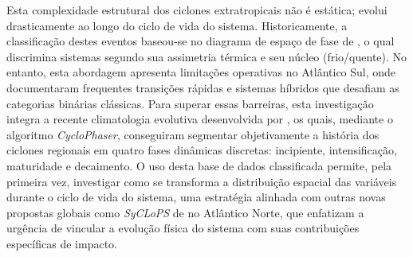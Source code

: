 Esta complexidade estrutural dos ciclones extratropicais não é estática; evolui drasticamente ao longo do ciclo de vida do sistema. Historicamente, a classificação destes eventos baseou-se no diagrama de espaço de fase de \citet{hart2003cyclone}, o qual discrimina sistemas segundo sua assimetria térmica e seu núcleo (frio/quente).
No entanto, esta abordagem apresenta limitações operativas no Atlântico Sul, onde \citet{reboita2022from} documentaram frequentes transições rápidas e sistemas híbridos que desafiam as categorias binárias clássicas.
Para superar essas barreiras, esta investigação integra a recente climatologia evolutiva desenvolvida por \citet{coutodesouza2024new}, os quais, mediante o algoritmo \textit{CycloPhaser}, conseguiram segmentar objetivamente a história dos ciclones regionais em quatro fases dinâmicas discretas: incipiente, intensificação, maturidade e decaimento.
O uso desta base de dados classificada permite, pela primeira vez, investigar como se transforma a distribuição espacial das variáveis durante o ciclo de vida do sistema, uma estratégia alinhada com outras novas propostas globais como \textit{SyCLoPS} de \citet{han2025system} no Atlântico Norte, que enfatizam a urgência de vincular a evolução física do sistema com suas contribuições específicas de impacto.

